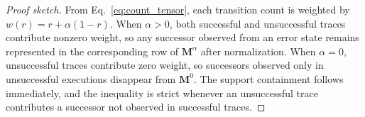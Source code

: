 \begin{proof}[Proof sketch]
From Eq.~\ref{eq:count_tensor}, each transition count is weighted by $w(r)=r+\alpha(1-r)$.
When $\alpha>0$, both successful and unsuccessful traces contribute nonzero weight, so any successor observed from an error state remains represented in the corresponding row of $\mathbf{M}^{\alpha}$ after normalization.
When $\alpha=0$, unsuccessful traces contribute zero weight, so successors observed only in unsuccessful executions disappear from $\mathbf{M}^{0}$.
The support containment follows immediately, and the inequality is strict whenever an unsuccessful trace contributes a successor not observed in successful traces.
\end{proof}

